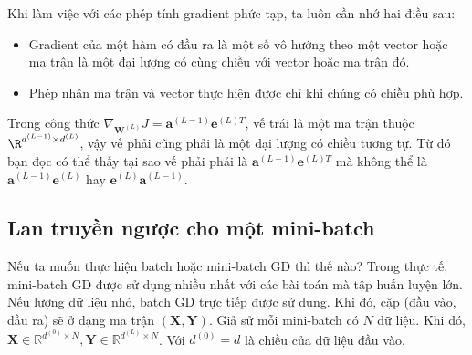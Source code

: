  
Khi làm việc với các phép tính gradient phức tạp, ta luôn cần nhớ hai điều sau:
\begin{itemize}
    \item Gradient của một hàm có đầu ra là một số vô hướng theo một vector hoặc
    ma trận là một đại lượng có cùng chiều với vector hoặc ma trận đó. 

    \item Phép nhân ma trận và vector thực hiện được chỉ khi chúng có chiều phù hợp.
\end{itemize}
 
Trong công thức $ \nabla_{\mathbf{W}^{(L)}}J =
\mathbf{a}^{(L-1)}\mathbf{e}^{(L)T}$, vế trái là một ma trận thuộc
$\R^{d^{(L-1)}\times d^{(L)}}$, vậy vế phải cũng phải là một đại lượng có chiều
tương tự. Từ đó bạn đọc có thể thấy tại sao vế phải phải là
$\mathbf{a}^{(L-1)}\mathbf{e}^{(L)T}$ mà không thể là
$\mathbf{a}^{(L-1)}\mathbf{e}^{(L)}$ hay $\mathbf{e}^{(L)}\mathbf{a}^{(L-1)}$.



 
 
\subsection{Lan truyền ngược cho một mini-batch}
 
Nếu ta muốn thực hiện batch hoặc mini-batch GD thì thế nào? Trong thực tế,
mini-batch GD được sử dụng nhiều nhất với các bài toán mà tập huấn luyện lớn.
Nếu lượng dữ liệu nhỏ, batch GD trực tiếp được sử dụng. Khi đó, cặp (đầu vào,
đầu ra) sẽ ở dạng ma trận $(\mathbf{X, Y})$. Giả sử
 mỗi mini-batch có $N$ dữ liệu. Khi đó, $\mathbf{X} \in \mathbb{R}^{d^{(0)} \times N}, \mathbf{Y} \in \mathbb{R}^{d^{(L)}\times N}$. Với $d^{(0)} = d$ là chiều của dữ liệu đầu vào. 
 
